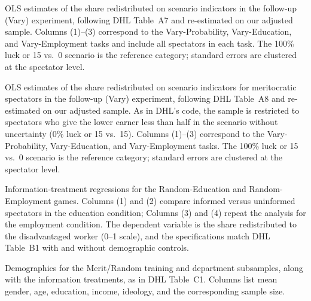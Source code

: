 \documentclass[12pt,a4paper]{article}
\begin{document}
\begin{table}[ht!]\scriptsize\centering

\caption{OLS estimates of the share redistributed on scenario indicators in the follow-up (Vary) experiment, following DHL Table~A7 and re-estimated on our adjusted sample. Columns (1)--(3) correspond to the Vary-Probability, Vary-Education, and Vary-Employment tasks and include all spectators in each task. The 100\% luck or 15 vs.\ 0 scenario is the reference category; standard errors are clustered at the spectator level.}
\label{tab:tableA7}
\end{table}

\begin{table}[ht!]\scriptsize\centering

\caption{OLS estimates of the share redistributed on scenario indicators for meritocratic spectators in the follow-up (Vary) experiment, following DHL Table~A8 and re-estimated on our adjusted sample. As in DHL's code, the sample is restricted to spectators who give the lower earner less than half in the scenario without uncertainty (0\% luck or 15 vs.\ 15). Columns (1)--(3) correspond to the Vary-Probability, Vary-Education, and Vary-Employment tasks. The 100\% luck or 15 vs.\ 0 scenario is the reference category; standard errors are clustered at the spectator level.}
\label{tab:tableA8}
\end{table}

\begin{table}[ht!]\scriptsize\centering
%

\caption{Information-treatment regressions for the Random-Education and Random-Employment games. Columns (1) and (2) compare informed versus uninformed spectators in the education condition; Columns (3) and (4) repeat the analysis for the employment condition. The dependent variable is the share redistributed to the disadvantaged worker (0--1 scale), and the specifications match DHL Table~B1 with and without demographic controls.}
\label{tableB1}
\end{table}

\begin{table}\scriptsize\centering

\caption{Demographics for the Merit/Random training and department subsamples, along with the information treatments, as in DHL Table~C1. Columns list mean gender, age, education, income, ideology, and the corresponding sample size.}
\label{tab:tableC1}
\end{table}






\end{document}
